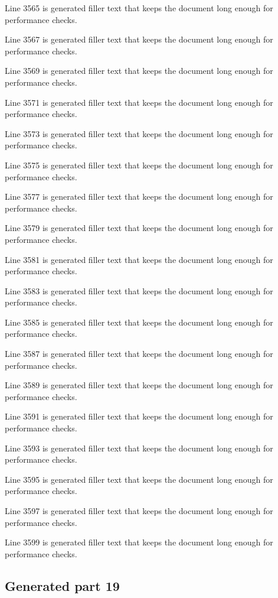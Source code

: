 Line 3565 is generated filler text that keeps the document long enough for performance checks.

Line 3567 is generated filler text that keeps the document long enough for performance checks.

Line 3569 is generated filler text that keeps the document long enough for performance checks.

Line 3571 is generated filler text that keeps the document long enough for performance checks.

Line 3573 is generated filler text that keeps the document long enough for performance checks.

Line 3575 is generated filler text that keeps the document long enough for performance checks.

Line 3577 is generated filler text that keeps the document long enough for performance checks.

Line 3579 is generated filler text that keeps the document long enough for performance checks.

Line 3581 is generated filler text that keeps the document long enough for performance checks.

Line 3583 is generated filler text that keeps the document long enough for performance checks.

Line 3585 is generated filler text that keeps the document long enough for performance checks.

Line 3587 is generated filler text that keeps the document long enough for performance checks.

Line 3589 is generated filler text that keeps the document long enough for performance checks.

Line 3591 is generated filler text that keeps the document long enough for performance checks.

Line 3593 is generated filler text that keeps the document long enough for performance checks.

Line 3595 is generated filler text that keeps the document long enough for performance checks.

Line 3597 is generated filler text that keeps the document long enough for performance checks.

Line 3599 is generated filler text that keeps the document long enough for performance checks.

\subsection{Generated part 19}


